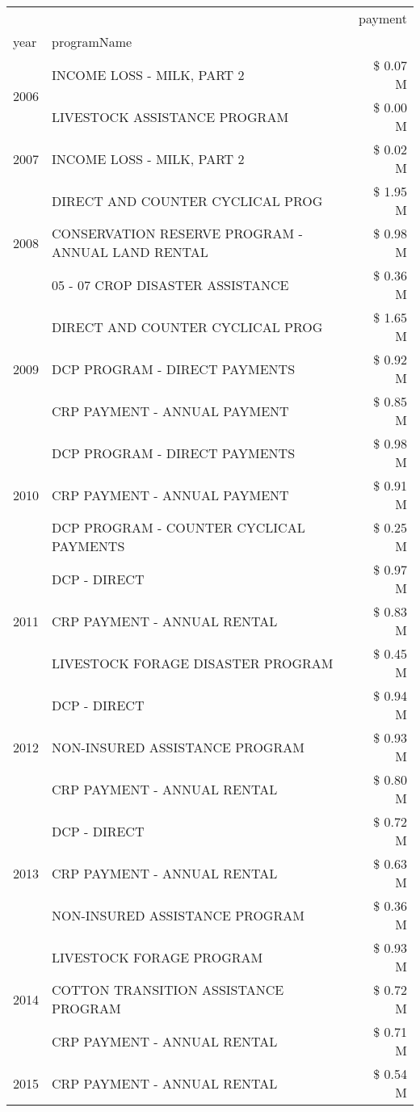 \begin{tabular}{llr}
\toprule
 &  & payment \\
year & programName &  \\
\midrule
\multirow[t]{2}{*}{2006} & INCOME LOSS - MILK, PART 2 & \$ 0.07 M \\
 & LIVESTOCK ASSISTANCE PROGRAM & \$ 0.00 M \\
\cline{1-3}
2007 & INCOME LOSS - MILK, PART 2 & \$ 0.02 M \\
\cline{1-3}
\multirow[t]{3}{*}{2008} & DIRECT AND COUNTER CYCLICAL PROG & \$ 1.95 M \\
 & CONSERVATION RESERVE PROGRAM - ANNUAL LAND RENTAL & \$ 0.98 M \\
 & 05 - 07 CROP DISASTER ASSISTANCE & \$ 0.36 M \\
\cline{1-3}
\multirow[t]{3}{*}{2009} & DIRECT AND COUNTER CYCLICAL PROG & \$ 1.65 M \\
 & DCP PROGRAM - DIRECT PAYMENTS & \$ 0.92 M \\
 & CRP PAYMENT - ANNUAL PAYMENT & \$ 0.85 M \\
\cline{1-3}
\multirow[t]{3}{*}{2010} & DCP PROGRAM - DIRECT PAYMENTS & \$ 0.98 M \\
 & CRP PAYMENT - ANNUAL PAYMENT & \$ 0.91 M \\
 & DCP PROGRAM - COUNTER CYCLICAL PAYMENTS & \$ 0.25 M \\
\cline{1-3}
\multirow[t]{3}{*}{2011} & DCP - DIRECT & \$ 0.97 M \\
 & CRP PAYMENT - ANNUAL RENTAL & \$ 0.83 M \\
 & LIVESTOCK FORAGE DISASTER PROGRAM & \$ 0.45 M \\
\cline{1-3}
\multirow[t]{3}{*}{2012} & DCP - DIRECT & \$ 0.94 M \\
 & NON-INSURED ASSISTANCE PROGRAM & \$ 0.93 M \\
 & CRP PAYMENT - ANNUAL RENTAL & \$ 0.80 M \\
\cline{1-3}
\multirow[t]{3}{*}{2013} & DCP - DIRECT & \$ 0.72 M \\
 & CRP PAYMENT - ANNUAL RENTAL & \$ 0.63 M \\
 & NON-INSURED ASSISTANCE PROGRAM & \$ 0.36 M \\
\cline{1-3}
\multirow[t]{3}{*}{2014} & LIVESTOCK FORAGE PROGRAM & \$ 0.93 M \\
 & COTTON TRANSITION ASSISTANCE PROGRAM & \$ 0.72 M \\
 & CRP PAYMENT - ANNUAL RENTAL & \$ 0.71 M \\
\cline{1-3}
\multirow[t]{3}{*}{2015} & CRP PAYMENT - ANNUAL RENTAL & \$ 0.54 M \\

\end{tabular}
